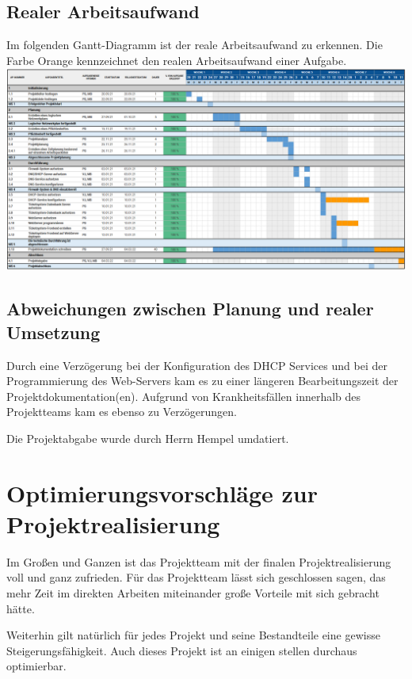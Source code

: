 \documentclass{scrartcl}
\begin{document}
\begin{flushleft}
    \subsection{Realer Arbeitsaufwand}
    Im folgenden Gantt-Diagramm ist der reale Arbeitsaufwand zu erkennen. Die Farbe Orange kennzeichnet den realen Arbeitsaufwand einer Aufgabe.
    \includegraphics[width=\linewidth]{img/Gantt.PNG}
    \subsection{Abweichungen zwischen Planung und realer Umsetzung}
    Durch eine Verzögerung bei der Konfiguration des DHCP Services und bei der Programmierung des Web-Servers kam es zu einer längeren Bearbeitungszeit der Projektdokumentation(en). Aufgrund von Krankheitsfällen innerhalb des Projektteams kam es ebenso zu Verzögerungen. \newline

    Die Projektabgabe wurde durch Herrn Hempel umdatiert.

    \section{Optimierungsvorschläge zur Projektrealisierung}
    Im Großen und Ganzen ist das Projektteam mit der finalen Projektrealisierung voll und ganz zufrieden. Für das Projektteam lässt sich geschlossen sagen, das mehr Zeit im direkten Arbeiten miteinander große Vorteile mit sich gebracht hätte. \newline
    
    Weiterhin gilt natürlich für jedes Projekt und seine Bestandteile eine gewisse Steigerungsfähigkeit. Auch dieses Projekt ist an einigen stellen durchaus optimierbar.


\end{flushleft}
\end{document}
